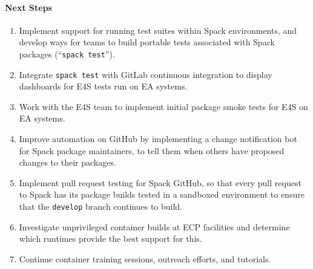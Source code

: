 \paragraph{Next Steps}

\begin{enumerate}
\item Implement support for running test suites within Spack environments, and
      develop ways for teams to build portable tests associated with Spack
      packages (``{\tt spack test}'').

\item Integrate {\tt spack test} with GitLab continuous integration to display
      dashboards for E4S tests run on EA systems.

\item Work with the E4S team to implement initial package smoke tests for E4S
      on EA systems.

\item Improve automation on GitHub by implementing a change notification bot
      for Spack package maintainers, to tell them when others have proposed
      changes to their packages.

\item Implement pull request testing for Spack GitHub, so that every pull
      request to Spack has its package builds tested in a sandboxed
      environment to ensure that the {\tt develop} branch continues to build.

\item Investigate unprivileged container builds at ECP facilities and determine
      which runtimes provide the best support for this.

\item Continue container training sessions, outreach efforts, and tutorials.
\end{enumerate}
